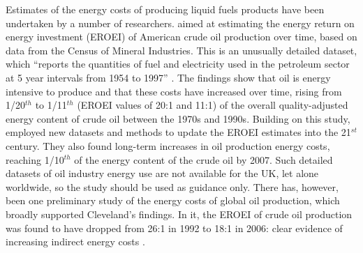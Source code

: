 Estimates of the energy costs of producing liquid fuels products have been
undertaken by a number of researchers. \citet{Cleveland2005} aimed 
at estimating the energy return on energy investment (EROEI) of American crude
oil production over time, based on data from the Census of Mineral Industries.
This is an unusually detailed dataset, which ``reports the quantities of fuel
and electricity used in the petroleum sector at 5 year intervals from 1954 to
1997'' \citep[p.~777]{Cleveland2005}. The findings show that oil is
energy intensive to produce and that these costs have increased
over time, rising from 1/20$^{th}$ to 1/11$^{th}$ (EROEI values of 20:1 and 11:1) of
the overall quality-adjusted energy content of crude oil between the 1970s and
1990s. Building on this study, \citet{Guilford2011} employed new datasets and
methods to update the EROEI estimates into the 21$^{st}$ century. They also found
long-term increases in oil production energy costs, reaching 1/10$^{th}$ of the
energy content of the crude oil by 2007.
Such detailed datasets of oil industry energy use are not available for the UK,
let alone worldwide, so the study should be used as guidance only. There has,
however, been one preliminary study of the energy costs of global oil
production, which broadly supported Cleveland's findings. In it, the
EROEI of crude oil production was found to have dropped from
26:1 in 1992 to 18:1 in 2006: clear evidence of increasing indirect energy
costs \citep{Gagnon2009}.

